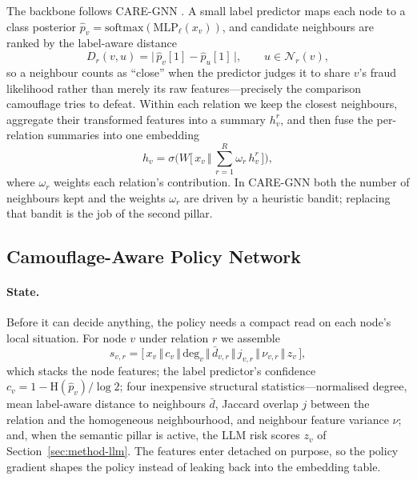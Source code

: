 \documentclass{conf}
\begin{document}
The backbone follows CARE-GNN \cite{dou2020enhancing}. A small label predictor
maps each node to a class posterior $\hat{p}_v=\mathrm{softmax}(\mathrm{MLP}_\ell(x_v))$,
and candidate neighbours are ranked by the label-aware distance
\begin{equation}
\label{eq:dist}
D_r(v,u) = \big|\,\hat{p}_v[1]-\hat{p}_u[1]\,\big|,
\qquad u\in\mathcal{N}_r(v),
\end{equation}
so a neighbour counts as ``close'' when the predictor judges it to share $v$'s
fraud likelihood rather than merely its raw features---precisely the comparison
camouflage tries to defeat. Within each relation we keep the closest
neighbours, aggregate their transformed features into a summary $h^r_v$, and
then fuse the per-relation summaries into one embedding
\begin{equation}
\label{eq:inter}
h_v = \sigma\!\Big(W\big[\,x_v \,\Vert\, \textstyle\sum_{r=1}^{R}\omega_r\, h^{r}_v\,\big]\Big),
\end{equation}
where $\omega_r$ weights each relation's contribution. In CARE-GNN both
the number of neighbours kept and the weights $\omega_r$ are driven by a
heuristic bandit; replacing that bandit is the job of the second pillar.

\subsection{Camouflage-Aware Policy Network}

\paragraph{State.} Before it can decide anything, the policy needs a compact
read on each node's local situation. For node $v$ under relation $r$ we assemble
\begin{equation}
\label{eq:state}
s_{v,r} = \big[\,x_v \,\Vert\, c_v \,\Vert\, \mathrm{deg}_v \,\Vert\,
\bar{d}_{v,r} \,\Vert\, j_{v,r} \,\Vert\, \nu_{v,r} \,\Vert\, z_v\,\big],
\end{equation}
which stacks the node features; the label predictor's confidence
$c_v = 1-\mathrm{H}(\hat{p}_v)/\log 2$; four inexpensive structural
statistics---normalised degree, mean label-aware distance to neighbours
$\bar d$, Jaccard overlap $j$ between the relation and the homogeneous
neighbourhood, and neighbour feature variance $\nu$; and, when the semantic
pillar is active, the LLM risk scores $z_v$ of Section~\ref{sec:method-llm}. The
features enter detached on purpose, so the policy gradient shapes the policy
instead of leaking back into the embedding table.
\end{document}

